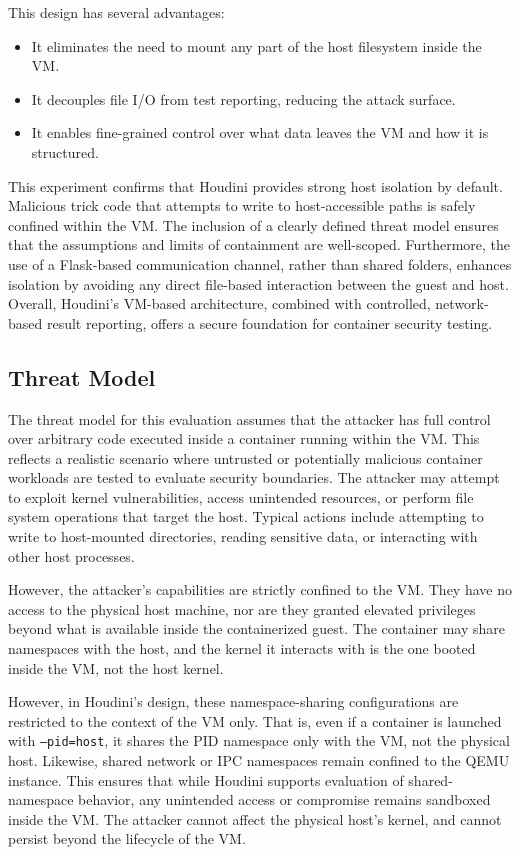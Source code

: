 \begin{doublespace}
This design has several advantages:
\begin{itemize}
    \item It eliminates the need to mount any part of the host filesystem inside the VM.
    \item It decouples file I/O from test reporting, reducing the attack surface.
    \item It enables fine-grained control over what data leaves the VM and how it is structured.
\end{itemize}


This experiment confirms that Houdini provides strong host isolation by default. Malicious trick code that attempts to write to host-accessible paths is safely confined within the VM. The inclusion of a clearly defined threat model ensures that the assumptions and limits of containment are well-scoped. Furthermore, the use of a Flask-based communication channel, rather than shared folders, enhances isolation by avoiding any direct file-based interaction between the guest and host. Overall, Houdini’s VM-based architecture, combined with controlled, network-based result reporting, offers a secure foundation for container security testing.


\subsection{Threat Model}

The threat model for this evaluation assumes that the attacker has full control over arbitrary code executed inside a container running within the VM. This reflects a realistic scenario where untrusted or potentially malicious container workloads are tested to evaluate security boundaries. The attacker may attempt to exploit kernel vulnerabilities, access unintended resources, or perform file system operations that target the host. Typical actions include attempting to write to host-mounted directories, reading sensitive data, or interacting with other host processes.

However, the attacker’s capabilities are strictly confined to the VM. They have no access to the physical host machine, nor are they granted elevated privileges beyond what is available inside the containerized guest. The container may share namespaces with the host, and the kernel it interacts with is the one booted inside the VM, not the host kernel.

However, in Houdini’s design, these namespace-sharing configurations are restricted to the context of the VM only. That is, even if a container is launched with \texttt{--pid=host}, it shares the PID namespace only with the VM, not the physical host. Likewise, shared network or IPC namespaces remain confined to the QEMU instance. This ensures that while Houdini supports evaluation of shared-namespace behavior, any unintended access or compromise remains sandboxed inside the VM. The attacker cannot affect the physical host’s kernel, and cannot persist beyond the lifecycle of the VM.


\end{doublespace}
